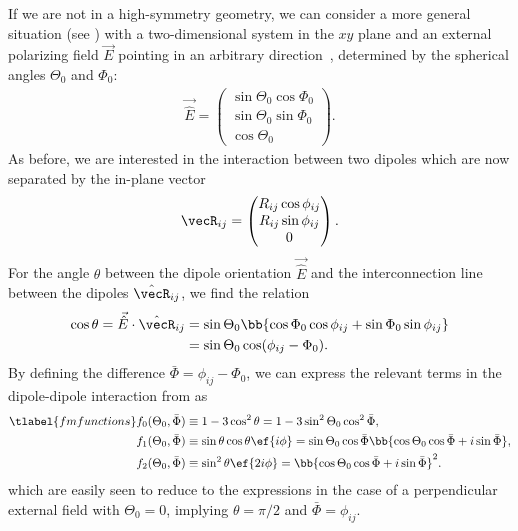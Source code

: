 If we are not in a high-symmetry geometry, we can consider a more general situation (see ) with a two-dimensional system in the $xy$ plane and an external polarizing field $\vec{E}$ pointing in an arbitrary direction~\cite{Gorshkov2011c}, determined by the spherical angles $\Theta_0$ and $\Phi_0$:
\begin{align}
    \vec{\hat{E}}=\begin{pmatrix}
        \sin\Theta_0\cos\Phi_0 \\
        \sin\Theta_0\sin\Phi_0 \\
        \cos\Theta_0
    \end{pmatrix}.
\end{align}
As before, we are interested in the interaction between two dipoles which are now separated
by the in-plane vector
\begin{align}
\vecR_{ij} = \begin{pmatrix}R_{ij} \cos\phi_{ij} \\ R_{ij} \sin\phi_{ij} \\ 0\end{pmatrix}.
\end{align}
For the angle $\theta$ between the dipole orientation $\vec{\hat{E}}$ and the interconnection line between the dipoles $\hat{\vecR}_{ij}$, we find the relation
\begin{align}
    \cos\theta = \vec{\hat{E}} \cdot \hat{\vecR}_{ij} &= \sin\Theta_0\bb{\cos\Phi_0\cos\phi_{ij}+\sin\Phi_0\sin\phi_{ij}}\\
                                                      &=\sin\Theta_0\cos(\phi_{ij}-\Phi_0).
\end{align}
By defining the difference $\bar\Phi=\phi_{ij}-\Phi_0$, we can express the relevant terms in the dipole-dipole interaction from  as
\begin{align} \tlabel{fmfunctions}
    f_0(\Theta_0, \bar \Phi)&\equiv 1-3\cos^2\theta = 1-3\sin^2\Theta_0\cos^2\bar\Phi, \vphantom{\bb{\bar \Phi}} \\
    f_1(\Theta_0, \bar \Phi)&\equiv \sin\theta\cos\theta \ef{i\phi} = \sin\Theta_0 \cos\bar\Phi \bb{\cos\Theta_0 \cos\bar\Phi + i \sin \bar\Phi}, \\
    f_2(\Theta_0, \bar \Phi)&\equiv\sin^2\theta \ef{2i\phi} = \bb{\cos\Theta_0 \cos\bar\Phi + i \sin \bar\Phi}^2.
\end{align}
which are easily seen to reduce to the expressions  in the case of a perpendicular external field with $\Theta_0=0$, implying $\theta=\pi/2$ and $\bar\Phi=\phi_{ij}$.
